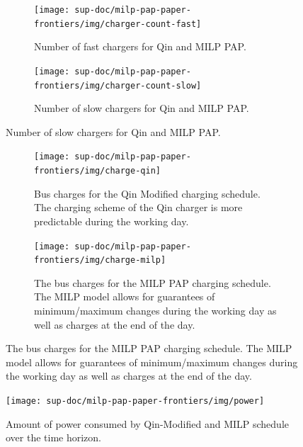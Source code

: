 \documentclass[ee,thesis]{usuthesis}
\begin{document}
\begin{figure}
    \begin{subfigure}[t]{\textwidth}
    \centering
        \texttt{[image: sup-doc/milp-pap-paper-frontiers/img/charger-count-fast]}
        \caption{Number of fast chargers for Qin and MILP PAP.}
        \label{subfig:fast-charger-usage}
    \end{subfigure}

    \hfill

    \begin{subfigure}[t]{\textwidth}
    \centering
        \texttt{[image: sup-doc/milp-pap-paper-frontiers/img/charger-count-slow]}
        \caption{Number of slow chargers for Qin and MILP PAP.}
        \label{subfig:slow-charger-usage}
    \end{subfigure}
\end{figure}

\begin{figure}
    \begin{subfigure}[t]{\textwidth}
    \centering
        \texttt{[image: sup-doc/milp-pap-paper-frontiers/img/charge-qin]}
        \caption{Bus charges for the Qin Modified charging schedule. The charging scheme of the Qin charger is more predictable during the working day.}
        \label{subfig:qin-charge}
    \end{subfigure}

    \hfill

    \begin{subfigure}[t]{\textwidth}
    \centering
        \texttt{[image: sup-doc/milp-pap-paper-frontiers/img/charge-milp]}
        \caption{The bus charges for the MILP PAP charging schedule. The MILP model allows for guarantees of minimum/maximum changes during the working day as well as charges at the end of the day.}
        \label{subfig:milp-charge}
    \end{subfigure}
\end{figure}

\begin{figure}[htpb]
\centering
    \texttt{[image: sup-doc/milp-pap-paper-frontiers/img/power]}
    \caption{Amount of power consumed by Qin-Modified and MILP schedule over the time horizon.}
    \label{fig:power-usage}
\end{figure}
\end{document}

